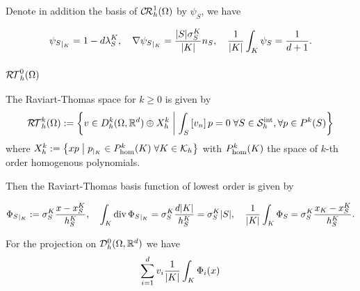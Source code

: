 Denote in addition the basis of $\mathcal{C\!R}^1_h(\Omega)$ by $\psi_S$, we have
%
\begin{yellowbox}
\begin{equation}\label{eq:}
{\psi_S}_{|_{K}} = 1- d \lambda_S^K, \quad \nabla {\psi_S}_{|_{K}} =
\frac{|S|\sigma_{S}^K}{|K|}n_S,\quad \frac{1}{|K|}\int_K \psi_S = \frac{1}{d+1}.
\end{equation}
\end{yellowbox}%
%


%
\subsubsection{$\mathcal{R\!T}^0_h(\Omega)$}
%

The Raviart-Thomas space for $k\ge0$ is given by
%
\begin{equation}\label{eq:}
\mathcal{R\!T}^k_h(\Omega):= \left\{v\in D^k_h(\Omega,\mathbb R^d)\oplus X^k_h\;\middle|\;\int_S\left[v_n\right]p=0\;\forall S\in\mathcal S^{\rm int}_h,\forall p\in P^{k}(S)\right\}
\end{equation}
%
where $X^k_h:=\left\{xp\;\middle|\;{p}_{|_{K}}\in P_{\rm hom}^{k}(K)\; \forall K\in\mathcal K_h\right\}$ with $P_{\rm hom}^{k}(K)$ the space of $k$-th order homogenous polynomials.

Then the Raviart-Thomas basis function of lowest order is given by
%
\begin{yellowbox}
\begin{equation}\label{eq:BasisFctRt}
{\Phi_S}_{|_{K}} := \sigma_{S}^K \frac{x-x_S^K}{h_S^K},\quad 
\int_K \operatorname{div} {\Phi_S}_{|_{K}} = \sigma_{S}^K \frac{d|K|}{h_S^K}=  \sigma_{S}^K|S|,\quad \frac{1}{|K|}\int_K \Phi_S = \sigma_{S}^K\frac{x_K - x_S^K}{h_S^K}.
\end{equation}
\end{yellowbox}
%
For the projection on $\mathcal{D}_h^0(\Omega,\mathbb R^d)$ we have 
%
\begin{align*}
\sum_{i=1}^d v_i \frac{1}{\left|K\right|}\int_K \Phi_i(x)
\end{align*}
%

%

\printbibliography[title=References Section~\thesection]

